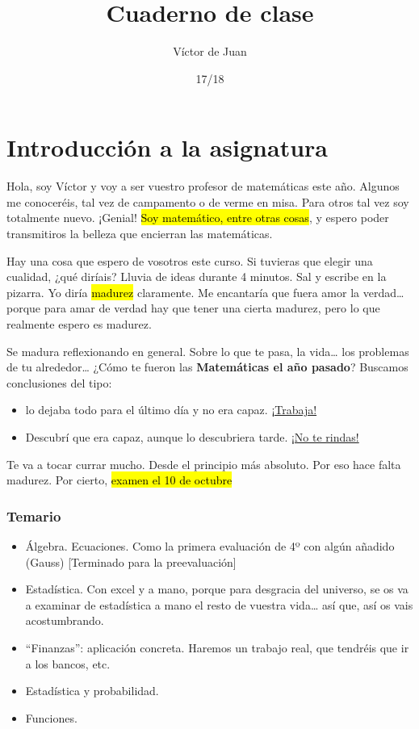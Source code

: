 \documentclass[palatino,nosec]{Docencia}
\title{Cuaderno de clase}
\author{Víctor de Juan}
\date{17/18}
\begin{document}
\pagestyle{plain}
\maketitle
\tableofcontents



\chapter{Introducción a la asignatura}


Hola, soy Víctor y voy a ser vuestro profesor de matemáticas este año. Algunos me conoceréis, tal vez de campamento o de verme en misa. Para otros tal vez soy totalmente nuevo. ¡Genial! \hl{Soy matemático, entre otras cosas}, y espero poder transmitiros la belleza que encierran las matemáticas.

Hay una cosa que espero de vosotros este curso.  Si tuvieras que elegir una cualidad, ¿qué diríais? Lluvia de ideas durante 4 minutos. Sal y escribe en la pizarra. Yo diría \hl{madurez} claramente. Me encantaría que fuera amor la verdad… porque para amar de verdad hay que tener una cierta madurez, pero lo que realmente espero es madurez.

Se madura reflexionando en general. Sobre lo que te pasa, la vida… los problemas de tu alrededor…  ¿Cómo te fueron las \textbf{Matemáticas el año pasado}? Buscamos conclusiones del tipo: 
\begin{itemize}
	\item lo dejaba todo para el último día y no era capaz. \ul{¡Trabaja!}
	\item Descubrí que era capaz, aunque lo descubriera tarde. \ul{¡No te rindas!}
\end{itemize}

Te va a tocar currar mucho. Desde el principio más absoluto. Por eso hace falta madurez. Por cierto, \hl{examen el 10 de octubre}

\subsection{Temario}

\begin{itemize}
	\item Álgebra. Ecuaciones. Como la primera evaluación de 4º con algún añadido (Gauss) [Terminado para la preevaluación]
	\item Estadística. Con excel y a mano, porque para desgracia del universo, se os va a examinar de estadística a mano el resto de vuestra vida… así que, así os vais acostumbrando.
	\item “Finanzas”: aplicación concreta. Haremos un trabajo real, que tendréis que ir a los bancos, etc. 
	\item Estadística y probabilidad.
	\item Funciones.
\end{itemize}
\end{document}
